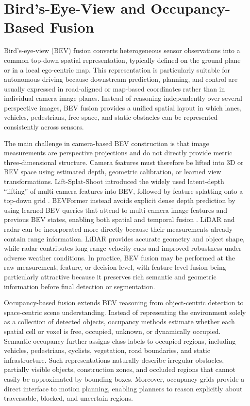 \documentclass[graybox,envcountchap]{style/SNmono}
\begin{document}
\section{Bird's-Eye-View and Occupancy-Based Fusion}



Bird's-eye-view (BEV) fusion converts heterogeneous sensor observations into a common top-down spatial representation, typically defined on the ground plane or in a local ego-centric map. This representation is particularly suitable for autonomous driving because downstream prediction, planning, and control are usually expressed in road-aligned or map-based coordinates rather than in individual camera image planes. Instead of reasoning independently over several perspective images, BEV fusion provides a unified spatial layout in which lanes, vehicles, pedestrians, free space, and static obstacles can be represented consistently across sensors.

The main challenge in camera-based BEV construction is that image measurements are perspective projections and do not directly provide metric three-dimensional structure. Camera features must therefore be lifted into 3D or BEV space using estimated depth, geometric calibration, or learned view transformations. Lift-Splat-Shoot introduced the widely used latent-depth ``lifting'' of multi-camera features into BEV, followed by feature splatting onto a top-down grid \cite{philion2020_lss}. BEVFormer instead avoids explicit dense depth prediction by using learned BEV queries that attend to multi-camera image features and previous BEV states, enabling both spatial and temporal fusion \cite{li2022_bevformer}. LiDAR and radar can be incorporated more directly because their measurements already contain range information. LiDAR provides accurate geometry and object shape, while radar contributes long-range velocity cues and improved robustness under adverse weather conditions. In practice, BEV fusion may be performed at the raw-measurement, feature, or decision level, with feature-level fusion being particularly attractive because it preserves rich semantic and geometric information before final detection or segmentation.

Occupancy-based fusion extends BEV reasoning from object-centric detection to space-centric scene understanding. Instead of representing the environment solely as a collection of detected objects, occupancy methods estimate whether each spatial cell or voxel is free, occupied, unknown, or dynamically occupied. Semantic occupancy further assigns class labels to occupied regions, including vehicles, pedestrians, cyclists, vegetation, road boundaries, and static infrastructure. Such representations naturally describe irregular obstacles, partially visible objects, construction zones, and occluded regions that cannot easily be approximated by bounding boxes. Moreover, occupancy grids provide a direct interface to motion planning, enabling planners to reason explicitly about traversable, blocked, and uncertain regions.
\end{document}

